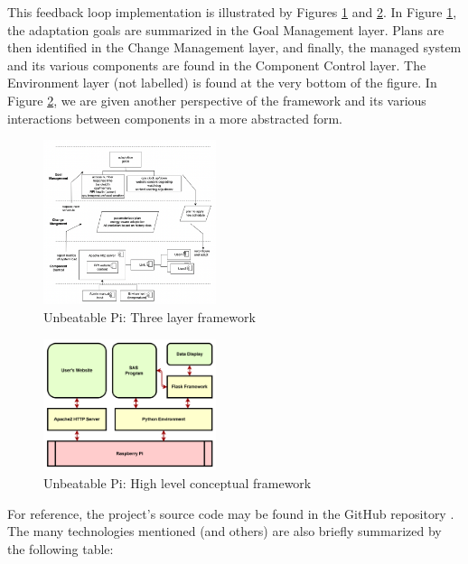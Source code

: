 \documentclass[conference]{IEEEtran}
\begin{document}
This feedback loop implementation is illustrated by Figures \ref{fig:three_layer_framework} and \ref{fig:high_level_framework}. In Figure \ref{fig:three_layer_framework}, the adaptation goals are summarized in the Goal Management layer. Plans are then identified in the Change Management layer, and finally, the managed system and its various components are found in the Component Control layer. The Environment layer (not labelled) is found at the very bottom of the figure. In Figure \ref{fig:high_level_framework}, we are given another perspective of the framework and its various interactions between components in a more abstracted form.

\begin{figure}[H]
    \centering
    \includegraphics[width=0.45\textwidth]{./media/three_layer_framework.png}
    \caption{Unbeatable Pi: Three layer framework}
    \label{fig:three_layer_framework}
\end{figure}

\begin{figure}[H]
    \centering
    \includegraphics[width=0.45\textwidth]{./media/high_level_framework.png}
    \caption{Unbeatable Pi: High level conceptual framework}
    \label{fig:high_level_framework}
\end{figure}

For reference, the project's source code may be found in the GitHub repository \cite{arthur_github}. The many technologies mentioned (and others) are also briefly summarized by the following table:
\end{document}
